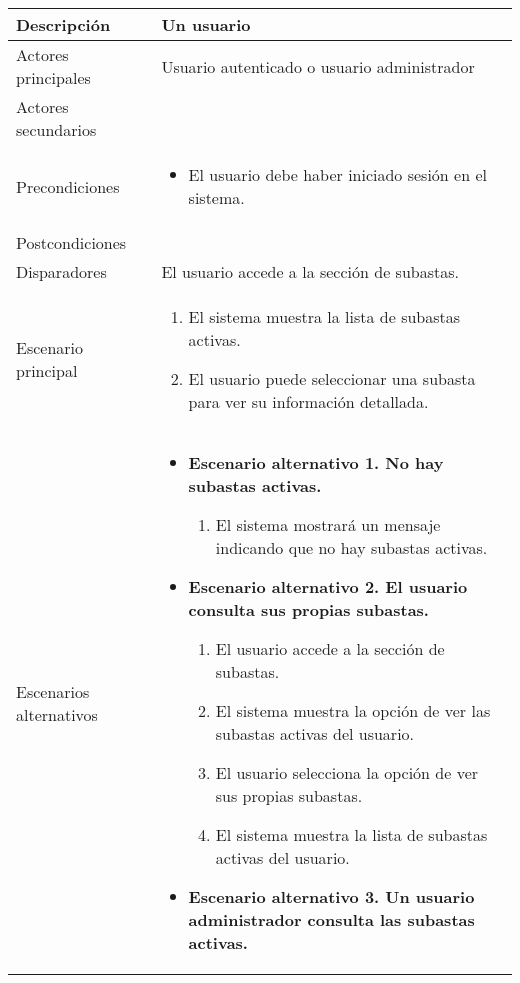 \begin{longtable}{
    >{\columncolor{lightgreen!20}}p{4cm}
    p{12cm}
    }
    \midrule
    Descripción & Un usuario  \\
    \midrule
    Actores principales & Usuario autenticado o usuario administrador \\
    \midrule
    Actores secundarios &  \\
    \midrule
    Precondiciones & \begin{itemize}[nosep,leftmargin=*]
        \item El usuario debe haber iniciado sesión en el sistema.
    \end{itemize} \\
    \midrule
    Postcondiciones &  \\
    \midrule
    Disparadores & El usuario accede a la sección de subastas. \\
    \midrule
    Escenario principal & \begin{enumerate}[nosep,leftmargin=*]
        \item El sistema muestra la lista de subastas activas.
        \item El usuario puede seleccionar una subasta para ver su información detallada.
    \end{enumerate} \\
    \midrule
    Escenarios alternativos & 
    \begin{itemize}[nosep,leftmargin=*]
        \item \textbf{Escenario alternativo 1. No hay subastas activas.}
        \begin{enumerate}[nosep,leftmargin=*]
            \item El sistema mostrará un mensaje indicando que no hay subastas activas.
        \end{enumerate}
        \item \textbf{Escenario alternativo 2. El usuario consulta sus propias subastas.} 
        \begin{enumerate}[nosep,leftmargin=*]
            \item El usuario accede a la sección de subastas.
            \item El sistema muestra la opción de ver las subastas activas del usuario.
            \item El usuario selecciona la opción de ver sus propias subastas.
            \item El sistema muestra la lista de subastas activas del usuario.
        \end{enumerate}
        \item \textbf{Escenario alternativo 3. Un usuario administrador consulta las subastas activas.}

\end{itemize}
\end{longtable}
